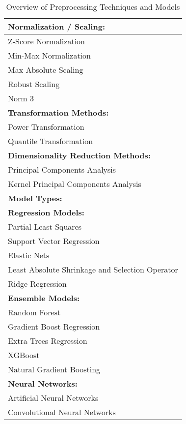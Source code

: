 \begin{table}[ht]
\centering
\begin{tabularx}{\columnwidth}{>{\raggedright\arraybackslash}X}
\toprule
\textbf{Normalization / Scaling:} \\
\midrule
Z-Score Normalization \\
Min-Max Normalization \\
Max Absolute Scaling \\
Robust Scaling \\
Norm 3 \\
\midrule
\textbf{Transformation Methods:} \\
\midrule
Power Transformation \\
Quantile Transformation \\
\midrule
\textbf{Dimensionality Reduction Methods:} \\
\midrule
Principal Components Analysis \\
Kernel Principal Components Analysis \\
\midrule
\textbf{Model Types:} \\
\midrule
\textbf{Regression Models:} \\
\quad Partial Least Squares \\
\quad Support Vector Regression \\
\quad Elastic Nets \\
\quad Least Absolute Shrinkage and Selection Operator \\
\quad Ridge Regression \\
\textbf{Ensemble Models:} \\
\quad Random Forest \\
\quad Gradient Boost Regression \\
\quad Extra Trees Regression \\
\quad XGBoost \\
\quad Natural Gradient Boosting \\
\textbf{Neural Networks:} \\
\quad Artificial Neural Networks \\
\quad Convolutional Neural Networks \\\bottomrule
\end{tabularx}
\caption{Overview of Preprocessing Techniques and Models}
\label{tab:preprocessing-models}
\end{table}